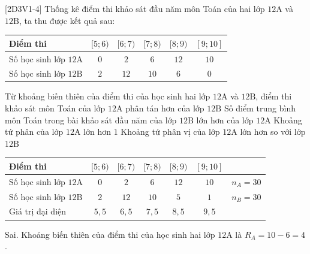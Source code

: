 \begin{ex}%
[2D3V1-4]%
	Thống kê điểm thi khảo sát đầu năm môn Toán của hai lớp $12\mathrm{A}$ và $12\mathrm{B}$, ta thu được kết quả sau: 
	\begin{center}
		\begin{tabular}{|l|c|c|c|c|c|}
			\hline Điểm thi & $[5 ; 6)$ & $[6 ; 7)$ & $[7 ; 8)$ & $[8 ; 9)$ & $[9 ; 10]$ \\
			\hline 
			Số học sinh lớp $12\mathrm{A}$ & $0$ & $2$ & $6$ & $12$ & $10$ \\
			\hline 
			Số học sinh lớp $12\mathrm{B}$ & $2$ & $12$ & $10$ & $6$ & $0$ \\
			\hline
		\end{tabular}
	\end{center}
	\choiceTF
	{Từ khoảng biến thiên của điểm thi của học sinh hai lớp $12\mathrm{A}$ và $12\mathrm{B}$, điểm thi khảo sát môn Toán của lớp $12\mathrm{A}$ phân tán hơn của lớp $12\mathrm{B}$}
	{Số điểm trung bình môn Toán trong bài khảo sát đầu năm của lớp $12\mathrm{B}$ lớn hơn của lớp $12\mathrm{A}$}
	{\True Khoảng tứ phân của lớp $12\mathrm{A}$ lớn hơn $1$}
	{\True Khoảng tứ phân vị của lớp $12\mathrm{A}$ lớn hơn so với lớp $12\mathrm{B}$}
	\loigiai
	{
		\begin{center}
			\begin{tabular}{|l|c|c|c|c|c|c|}
				\hline Điểm thi & $[5 ; 6)$ & $[6 ; 7)$ & $[7 ; 8)$ & $[8 ; 9)$ & $[9 ; 10]$ & \\
				\hline 
				Số học sinh lớp $12\mathrm{A}$ & $0$ & $2$ & $6$ & $12$ & $10$ & $n_A=30$ \\
				\hline
				Số học sinh lớp $12\mathrm{B}$ & $2$ & $12$ & $10$ & $5$ & $1$ & $n_B=30$ \\
				\hline 
				Giá trị đại diện & $5{,}5$ & $6{,}5$ & $7{,}5$ & $8{,}5$ & $9{,}5$ & \\
				\hline
			\end{tabular}
		\end{center}
		\begin{itemchoice}
			\itemch Sai. Khoảng biến thiên của điểm thi của học sinh hai lớp $12\mathrm{A}$ là $R_A=10-6=4$.\\

\end{itemchoice}}
\end{ex}
